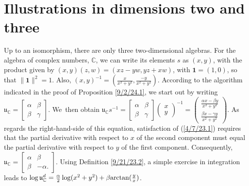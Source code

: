 \documentclass{amsart}
\numberwithin{equation}{section}
\theoremstyle{definition}
\numberwithin{theorem}{section}
\begin{document}
\section{Illustrations in dimensions two and three}
Up to an isomorphism, there are only three two-dimensional algebras.
For the algebra of complex numbers, $\mathbb{C}$, we can write its elements $s$ as $(x,y)$, with the product given by $(x,y)(z,w) = (xz-yw, yz+xw)$, with $\mathbf{1}=(1,0)$, so that $\|\mathbf{1}\|^2=1$.  Also, $(x,y)^{-1} = (\frac{x}{x^2+y^2},\frac{-y}{x^2+y^2})$.  According to the algorithm indicated in the proof of Proposition \ref{9/2/24.1}, we start out by writing  $\mathfrak{u}_\mathbb{C} = \left[\begin{array}{ccc}
 \alpha & \beta   \\ 
 \beta & \gamma    
\end{array}\right]$.  \mbox{We then} obtain  $\mathfrak{u}_\mathbb{C}s^{-1} = \left[\begin{array}{ccc}
 \alpha & \beta   \\ 
 \beta & \gamma    
\end{array}\right]\left(\begin{array}{ccc}
x   \\ 
y   
\end{array}\right)^{-1} = \left(\begin{array}{ccc}
\frac{\alpha x - \beta y}{x^2+y^2}  \\ 
\frac{\beta x - \gamma y}{x^2+y^2} 
\end{array}\right)$.  As regards the right-hand-side of this equation, satisfaction of (\ref{4/7/23.1}) requires that the partial derivative with respect to $x$ of the second component must equal the partial derivative with respect to $y$ of the first component.  Consequently, $\mathfrak{u}_{\mathbb{C}} = \left[\begin{array}{ccc}
 \alpha & \beta   \\ 
 \beta & -\alpha.    
\end{array}\right]$.  Using Definition \ref{9/21/23.2}, a simple exercise in integration leads to $\log  \mathfrak{u}^d_{\mathbb{C}} = \frac{\alpha}{2}\log(x^2+y^2) + \beta{\rm arctan}(\frac{y}{x})$.
\end{document}
